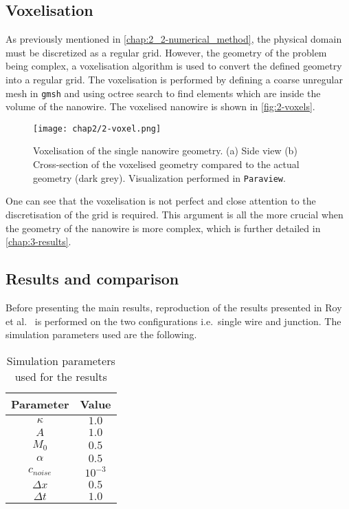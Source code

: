 \subsection{Voxelisation}
    As previously mentioned in \autoref{chap:2_2-numerical_method}, the physical domain must be discretized as a regular grid. However, the geometry of the problem being complex, a voxelisation algorithm is used to convert the defined geometry into a regular grid. The voxelisation is performed by defining a coarse unregular mesh in \texttt{gmsh} and using octree search to find elements which are inside the volume of the nanowire. The voxelised nanowire is shown in \autoref{fig:2-voxels}.
    \begin{figure}[H]
        \centering
        \texttt{[image: chap2/2-voxel.png]}
        \caption{Voxelisation of the single nanowire geometry. (a) Side view (b) Cross-section of the voxelised geometry compared to the actual geometry (dark grey). Visualization performed in \texttt{Paraview}.}
        \label{fig:2-voxels}
    \end{figure}
    One can see that the voxelisation is not perfect and close attention to the discretisation of the grid is required. This argument is all the more crucial when the geometry of the nanowire is more complex, which is further detailed in \autoref{chap:3-results}.
\subsection{Results and comparison}
    Before presenting the main results, reproduction of the results presented in Roy et al.\ \cite{RoyVarmaGururajan2021} is performed on the two configurations i.e.\ single wire and junction.
    The simulation parameters used are the following.
    \begin{table}[H]
        \centering
        \begin{tabular}{|c|c|}
            \hline
            Parameter & Value \\
            \hline
            $\kappa$ & $1.0$ \\
            $A$ & $1.0$ \\
            $M_0$ & $0.5$ \\
            $\alpha$ & $0.5$ \\
            $c_{noise}$ & $10^{-3}$\\
            $\Delta x$ & $0.5$ \\
            $\Delta t$ & $1.0$ \\
            \hline
        \end{tabular}
        \caption{Simulation parameters used for the results}
        \label{tab:2-parameters}
    \end{table}
